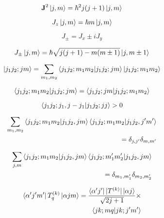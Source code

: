 \documentclass[11pt]{article}
\newcommand{\vect}[1]{\boldsymbol{\mathbf{#1}}}
\begin{document}
\begin{multicols}{2}
\begin{equation}
\vect{J}^2 \ket{j,m} = \hbar^2 j (j+1) \ket{j,m}
\end{equation}

\begin{equation}
J_z \ket{j,m} = \hbar m \ket{j,m}
\end{equation}

\begin{equation}
J_{\pm} = J_x \pm i J_y
\end{equation}

\begin{equation}
J_{\pm} \ket{j,m} = \hbar \sqrt{j(j+1)-m(m\pm1)} \ket{j,m\pm1}
\end{equation}

\begin{equation}
\ket{j_1j_2;jm} =
 \sum_{m_1,m_2} \braket{j_1j_2;m_1m_2|j_1j_2;jm} \ket{j_1j_2;m_1m_2}
\end{equation}

\begin{equation}
\braket{j_1j_2;m_1m_2|j_1j_2;jm}
 = \braket{j_1j_2;jm|j_1j_2;m_1m_2}
\end{equation}

\begin{equation}
\braket{j_1j_2;j_1,j-j_1|j_1j_2;jj} > 0
\end{equation}

\begin{equation}
\begin{split}
\sum_{m_1,m_2} \braket{j_1j_2;m_1m_2|j_1j_2,jm} \braket{j_1j_2;m_1m_2|j_1j_2,j'm'} \\ = \delta_{j,j'}\delta_{m,m'}
\end{split}
\end{equation}

\begin{equation}
\begin{split}
\sum_{j,m} \braket{j_1j_2;m_1m_2|j_1j_2,jm} \braket{j_1j_2;m_1'm_2'|j_1j_2,jm} \\ = \delta_{m_1,m_1'}\delta_{m_2,m_2'}
\end{split}
\end{equation}

\begin{equation}
\begin{split}
\bra{\alpha' j' m'}T^{(k)}_q\ket{\alpha j m} =
  \frac{\bra{\alpha ' j'}|T^{(k)}|\ket{\alpha j}}{\sqrt{2j+1}} \times \\
  \braket{jk;mq|jk;j'm'}
\end{split}
\end{equation}


\end{multicols}
\end{document}
